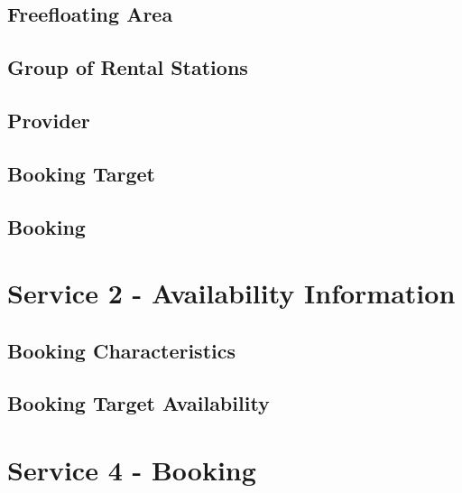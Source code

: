 \subsection*{Freefloating Area}



\subsection*{Group of Rental Stations}



\subsection*{Provider}



\subsection*{Booking Target}



\subsection*{Booking}



\section{Service 2 - Availability Information}
\label{sec:Datenmodell:Dienst2}

\subsection*{Booking Characteristics}



\subsection*{Booking Target Availability}



\section{Service 4 - Booking}
\label{sec:Datenmodell:Dienst4}

